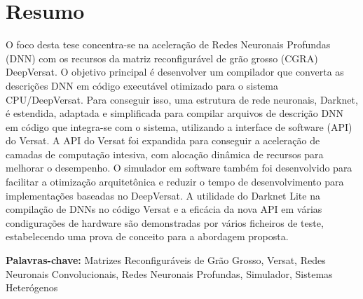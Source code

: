 
\section*{Resumo}



O foco desta tese concentra-se na aceleração de Redes Neuronais Profundas (DNN) com os recursos da matriz reconfigurável de grão grosso (CGRA) DeepVersat.
O objetivo principal é desenvolver um compilador que converta as descrições DNN em código executável otimizado para o sistema CPU/DeepVersat. Para conseguir isso, uma estrutura de rede neuronais, Darknet, é estendida, adaptada e simplificada para compilar arquivos de descrição DNN em código que integra-se com o sistema, utilizando a interface de software (API) do Versat. A API do Versat foi expandida para conseguir a aceleração de camadas de computação intesiva, com alocação dinâmica de recursos para melhorar o desempenho. O simulador em software também foi desenvolvido para facilitar a otimização  arquitetônica e reduzir o tempo de desenvolvimento para implementações baseadas no DeepVersat. A utilidade do Darknet Lite na compilação de DNNs no código Versat e a eficácia da nova API em várias condigurações de hardware são demonstradas por vários ficheiros de teste, estabelecendo uma prova de conceito para a abordagem proposta.


\vfill

\textbf{\Large Palavras-chave:} Matrizes Reconfiguráveis de Grão Grosso, Versat, Redes Neuronais Convolucionais, Redes Neuronais Profundas, Simulador, Sistemas Heterógenos

